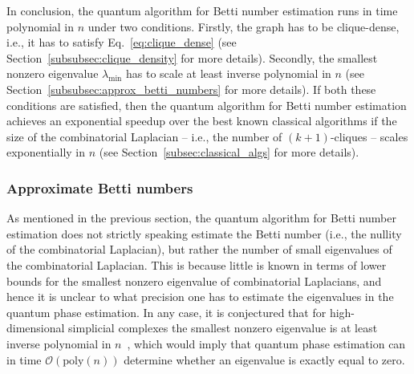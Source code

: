 \documentclass[a4paper, onecolumn, accepted=2022-08-28]{quantumarticle}
\newcommand{\bigO}[1]{\mathcal{O}\left( #1 \right)}
\begin{document}
In conclusion, the quantum algorithm for Betti number estimation runs in time polynomial in $n$ under two conditions.
Firstly, the graph has to be clique-dense, i.e., it has to satisfy Eq.~\eqref{eq:clique_dense} (see Section~\ref{subsubsec:clique_density} for more details).
Secondly, the smallest nonzero eigenvalue $\lambda_{\mathrm{min}}$ has to scale at least inverse polynomial in $n$ (see Section~\ref{subsubsec:approx_betti_numbers} for more details).
If both these conditions are satisfied, then the quantum algorithm for Betti number estimation achieves an exponential speedup over the best known classical algorithms if the size of the combinatorial Laplacian -- i.e., the number of $(k+1)$-cliques -- scales exponentially in $n$ (see Section~\ref{subsec:classical_algs} for more details). 

\subsubsection{Approximate Betti numbers
\label{subsubsec:approx_betti_numbers}}

As mentioned in the previous section, the quantum algorithm for Betti number estimation does not strictly speaking estimate the Betti number (i.e., the nullity of the combinatorial Laplacian), but rather the number of small eigenvalues of the combinatorial Laplacian.
This is because little is known in terms of lower bounds for the smallest nonzero eigenvalue of combinatorial Laplacians, and hence it is unclear to what precision one has to estimate the eigenvalues in the quantum phase estimation.
In any case, it is conjectured that for high-dimensional simplicial complexes the smallest nonzero eigenvalue is at least inverse polynomial in $n$~\cite{friedman:computing_betti}, which would imply that quantum phase estimation can in time $\bigO{\mathrm{poly}(n)}$ determine whether an eigenvalue is exactly equal to zero.
\end{document}
